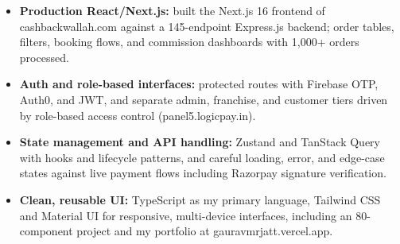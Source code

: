 \documentclass[]{cover}
\begin{document}


\currentdate{\today}



{\raggedright{}\fontsize{11pt}{13pt}\selectfont
\renewcommand{\labelitemi}{\textbullet}
\renewcommand{\labelitemii}{\textbullet}
\renewcommand{\labelitemiii}{\textbullet}
\begin{itemize}
    \item {\textbf{Production React/Next.js:} built the Next.js 16 frontend of cashbackwallah.com against a 145-endpoint Express.js backend; order tables, filters, booking flows, and commission dashboards with 1,000+ orders processed.}
    \item {\textbf{Auth and role-based interfaces:} protected routes with Firebase OTP, Auth0, and JWT, and separate admin, franchise, and customer tiers driven by role-based access control (panel5.logicpay.in).}
    \item {\textbf{State management and API handling:} Zustand and TanStack Query with hooks and lifecycle patterns, and careful loading, error, and edge-case states against live payment flows including Razorpay signature verification.}
    \item {\textbf{Clean, reusable UI:} TypeScript as my primary language, Tailwind CSS and Material UI for responsive, multi-device interfaces, including an 80-component project and my portfolio at gauravmrjatt.vercel.app.}
\end{itemize}\par}
\vspace{6pt}
\end{document}

